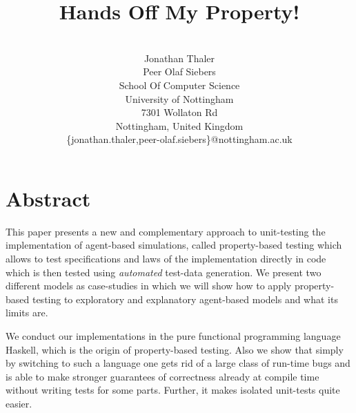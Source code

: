 \documentclass{scspaperproc}
\begin{document}


\title{Hands Off My Property!}

\author{
\\%
Jonathan Thaler \\ 
Peer Olaf Siebers \\ [12pt] 
School Of Computer Science \\
University of Nottingham \\
7301 Wollaton Rd \\
Nottingham, United Kingdom \\
\{jonathan.thaler,peer-olaf.siebers\}@nottingham.ac.uk\\
}



\maketitle

\section*{Abstract}

This paper presents a new and complementary approach to unit-testing the implementation of agent-based simulations, called property-based testing which allows to test specifications and laws of the implementation directly in code which is then tested using \textit{automated} test-data generation. We present two different models as case-studies in which we will show how to apply property-based testing to exploratory and explanatory agent-based models and what its limits are.

We conduct our implementations in the pure functional programming language Haskell, which is the origin of property-based testing. Also we show that simply by switching to such a language one gets rid of a large class of run-time bugs and is able to make stronger guarantees of correctness already at compile time without writing tests for some parts. Further, it makes isolated unit-tests quite easier.
\end{document}
